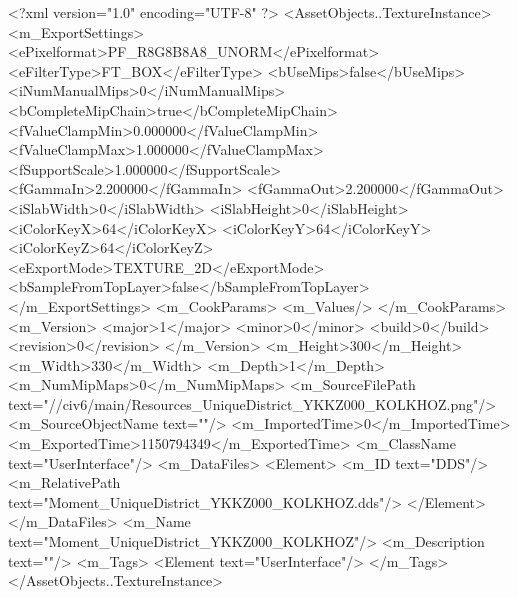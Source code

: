 <?xml version="1.0" encoding="UTF-8" ?>
<AssetObjects..TextureInstance>
	<m_ExportSettings>
		<ePixelformat>PF_R8G8B8A8_UNORM</ePixelformat>
		<eFilterType>FT_BOX</eFilterType>
		<bUseMips>false</bUseMips>
		<iNumManualMips>0</iNumManualMips>
		<bCompleteMipChain>true</bCompleteMipChain>
		<fValueClampMin>0.000000</fValueClampMin>
		<fValueClampMax>1.000000</fValueClampMax>
		<fSupportScale>1.000000</fSupportScale>
		<fGammaIn>2.200000</fGammaIn>
		<fGammaOut>2.200000</fGammaOut>
		<iSlabWidth>0</iSlabWidth>
		<iSlabHeight>0</iSlabHeight>
		<iColorKeyX>64</iColorKeyX>
		<iColorKeyY>64</iColorKeyY>
		<iColorKeyZ>64</iColorKeyZ>
		<eExportMode>TEXTURE_2D</eExportMode>
		<bSampleFromTopLayer>false</bSampleFromTopLayer>
	</m_ExportSettings>
	<m_CookParams>
		<m_Values/>
	</m_CookParams>
	<m_Version>
		<major>1</major>
		<minor>0</minor>
		<build>0</build>
		<revision>0</revision>
	</m_Version>
	<m_Height>300</m_Height>
	<m_Width>330</m_Width>
	<m_Depth>1</m_Depth>
	<m_NumMipMaps>0</m_NumMipMaps>
	<m_SourceFilePath text="//civ6/main/Resources\Moment_UniqueDistrict_YKKZ000_KOLKHOZ.png"/>
	<m_SourceObjectName text=""/>
	<m_ImportedTime>0</m_ImportedTime>
	<m_ExportedTime>1150794349</m_ExportedTime>
	<m_ClassName text="UserInterface"/>
	<m_DataFiles>
		<Element>
			<m_ID text="DDS"/>
			<m_RelativePath text="Moment_UniqueDistrict_YKKZ000_KOLKHOZ.dds"/>
		</Element>
	</m_DataFiles>
	<m_Name text="Moment_UniqueDistrict_YKKZ000_KOLKHOZ"/>
	<m_Description text=""/>
	<m_Tags>
		<Element text="UserInterface"/>
	</m_Tags>
</AssetObjects..TextureInstance>

